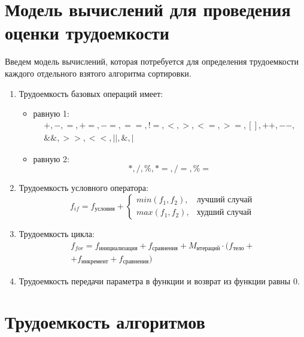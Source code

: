 \section{Модель вычислений для проведения оценки трудоемкости}

Введем модель вычислений, которая потребуется для определения трудоемкости каждого отдельного взятого алгоритма сортировки.
\begin{enumerate}[label={\arabic*)}]
	\item Трудоемкость базовых операций имеет:
	\begin{itemize}[label=---]
		\item равную 1:
		\begin{equation}
			\label{for:operations_1}
			\begin{gathered}
				+, -, =, +=, -=, ==, !=, <, >, <=, >=, [], ++, {-}-,\\
				\&\&, >>, <<, ||, \&, |
			\end{gathered}
		\end{equation}
		\item равную 2:
		\begin{equation}
			\label{for:operations_2}
			*, /, \%, *=, /=, \%=
		\end{equation}
	\end{itemize}
	\item Трудоемкость условного оператора:
	\begin{equation}
		\label{for:if}
		f_{if} = f_{\text{условия}} + 
		\begin{cases}
			min(f_1, f_2), & \text{лучший случай}\\
			max(f_1, f_2), & \text{худший случай}
		\end{cases}
	\end{equation}
	\item Трудоемкость цикла:
	\begin{equation}
		\label{for:for}
		\begin{gathered}
			f_{for} = f_{\text{инициализация}} + f_{\text{сравнения}} + M_{\text{итераций}} \cdot (f_{\text{тело}} +\\
			+ f_{\text{инкремент}} + f_{\text{сравнения}})
		\end{gathered}
	\end{equation}
	\item Трудоемкость передачи параметра в функции и возврат из функции равны 0.
\end{enumerate}

\section{Трудоемкость алгоритмов}

